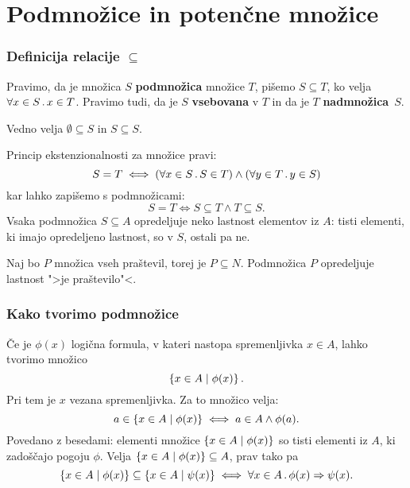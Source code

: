 \chapter{Podmnožice in potenčne množice}

\subsection{Definicija relacije $\subseteq$}

Pravimo, da je množica $S$ \textbf{podmnožica} množice $T$, pišemo $S \subseteq T$, ko velja $\forall x \in S \,.\, x \in T$. Pravimo tudi, da je $S$ \textbf{vsebovana} v $T$ in da je $T$ \textbf{nadmnožica}~$S$.

Vedno velja $\emptyset \subseteq S$ in $S \subseteq S$.

Princip ekstenzionalnosti za množice pravi:
%
\begin{equation*}
  S = T \iff (\forall x \in S \,.\, S \in T) \land (\forall y \in T \,.\, y \in S)
\end{equation*}
%
kar lahko zapišemo s podmnožicami:
%
\begin{equation*}
  S = T \iff S \subseteq T \land T \subseteq S.
\end{equation*}
%
Vsaka podmnožica $S \subseteq A$ opredeljuje neko lastnost elementov iz $A$: tisti
elementi, ki imajo opredeljeno lastnost, so v $S$, ostali pa ne.

\begin{primer}
  Naj bo $P$ množica vseh praštevil, torej je $P \subseteq N$. Podmnožica $P$
  opredeljuje lastnost ">je praštevilo"<.
\end{primer}


\subsection{Kako tvorimo podmnožice}

Če je $\phi(x)$ logična formula, v kateri nastopa spremenljivka $x \in A$, lahko tvorimo množico
%
\begin{equation*}
    \left\{ x \in A \; \middle| \; \phi(x) \right\}.
\end{equation*}
%
Pri tem je $x$ vezana spremenljivka. Za to množico velja:
%
\begin{equation*}
    a \in \left\{ x \in A \; \middle| \; \phi(x) \right\} \iff a \in A \land \phi(a).
\end{equation*}
%
Povedano z besedami: elementi množice $\left\{ x \in A \; \middle| \; \phi(x) \right\}$ so tisti elementi iz $A$, ki zadoščajo pogoju $\phi$.
%
Velja $\left\{ x \in A \; \middle| \; \phi(x) \right\} \subseteq A$, prav tako pa
\begin{equation*}
  \left\{x \in A \mid \phi(x)\right\} \subseteq \left\{x \in A \mid \psi(x)\right\} \iff
  \forall x \in A \,.\, \phi(x) \Rightarrow \psi(x).
\end{equation*}


